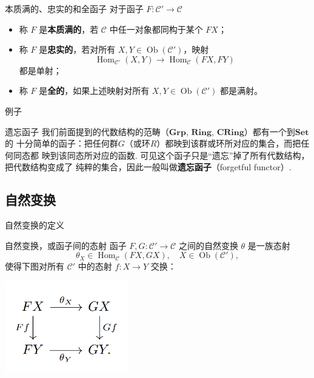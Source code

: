 \documentclass{beamer}
\newcommand\Set{\mathbf{Set}}
\newcommand\Ring{\mathbf{Ring}}
\newcommand\CRing{\mathbf{CRing}}
\newcommand\Grp{\mathbf{Grp}}
\begin{document}
	\begin{frame}{本质满的、忠实的和全函子}
		对于函子 $F: \mathcal{C}' \to \mathcal{C}$
		\begin{itemize}
			\item 称 $F$ 是\textbf{本质满的}，若 $\mathcal{C}$ 中任一对象都同构于某个 $FX$；
			
			\item 称 $F$ 是\textbf{忠实的}，若对所有 $X, Y \in \operatorname{Ob}(\mathcal{C}')$，映射
			\[
			\operatorname{Hom}_{\mathcal{C}'}(X, Y) \to \operatorname{Hom}_{\mathcal{C}}(FX, FY)
			\]
			都是单射；
			
			\item 称 $F$ 是\textbf{全的}，如果上述映射对所有 $X, Y \in \operatorname{Ob}(\mathcal{C}')$ 都是满射。	
		\end{itemize}
	
	\end{frame}
	\begin{frame}{例子}
		\begin{exampleblock}{遗忘函子}
			我们前面提到的代数结构的范畴（$\Grp$, $\Ring$, $\CRing$）都有一个到$\Set$的
			十分简单的函子：把任何群$G$（或环$R$）都映到该群或环所对应的集合，而把任何同态都
			映到该同态所对应的函数. 可见这个函子只是``遗忘''掉了所有代数结构，把代数结构变成了
			纯粹的集合，因此一般叫做\textbf{遗忘函子}（forgetful functor）.
		\end{exampleblock}
	\end{frame}
	
	\subsection{自然变换}
	
	\begin{frame}{自然变换的定义}
		\begin{exampleblock}{自然变换，或函子间的态射}
			函子 $F, G: \mathcal{C}' \to \mathcal{C}$ 之间的自然变换 $\theta$ 是一族态射
			\[
			\theta_X \in \operatorname{Hom}_{\mathcal{C}}(FX, GX), \quad X \in \operatorname{Ob}(\mathcal{C}'),
			\]
			使得下图对所有 $\mathcal{C}'$ 中的态射 $f: X \to Y$ 交换：
			\begin{center}
				\includegraphics[width=0.4\textwidth]{pic/figure2.png} 
			\end{center}
			
		\end{exampleblock}
	\end{frame}
	
\end{document}
